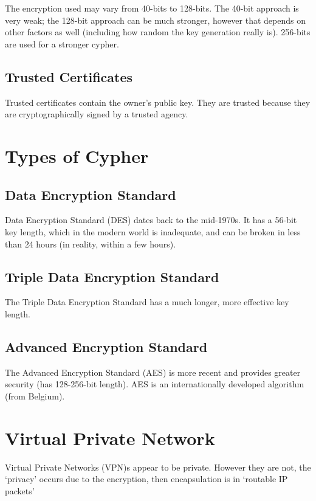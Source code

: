 The encryption used may vary from 40-bits to 128-bits. The 40-bit approach is very weak; the 128-bit approach can be much stronger, however that depends on other factors as well (including how random the key generation really is). 256-bits are used for a stronger cypher. 

\subsection*{Trusted Certificates}
Trusted certificates contain the owner's public key. They are trusted because they are cryptographically signed by a trusted agency. 

\section*{Types of Cypher}
\subsection*{Data Encryption Standard}
Data Encryption Standard (DES) dates back to the mid-1970s. It has a 56-bit key length, which in the modern world is inadequate, and can be broken in less than 24 hours (in reality, within a few hours).

\subsection*{Triple Data Encryption Standard}
The Triple Data Encryption Standard has a much longer, more effective key length.

\subsection*{Advanced Encryption Standard}
The Advanced Encryption Standard (AES) is more recent and provides greater security (has 128-256-bit length). AES is an internationally developed algorithm (from Belgium). 

\section*{Virtual Private Network}
Virtual Private Networks (VPN)s appear to be private. However they are not, the `privacy' occurs due to the encryption, then encapsulation is in `routable IP packets'

